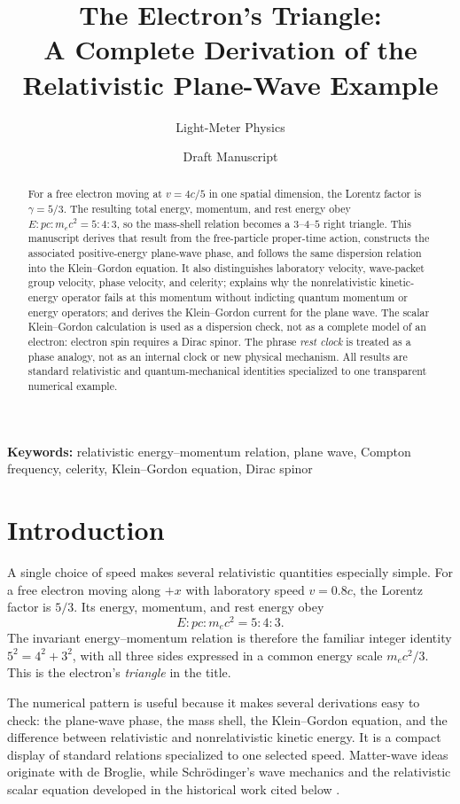 \documentclass[12pt]{article}
\title{The Electron's Triangle:\\
A Complete Derivation of the Relativistic Plane-Wave Example}
\author{Light-Meter Physics}
\date{Draft Manuscript}
\begin{document}
\maketitle

\begin{abstract}
For a free electron moving at $v=4c/5$ in one spatial dimension, the Lorentz factor is $\gamma=5/3$. The resulting total energy, momentum, and rest energy obey $E:pc:m_ec^2=5:4:3$, so the mass-shell relation becomes a $3$--$4$--$5$ right triangle. This manuscript derives that result from the free-particle proper-time action, constructs the associated positive-energy plane-wave phase, and follows the same dispersion relation into the Klein--Gordon equation. It also distinguishes laboratory velocity, wave-packet group velocity, phase velocity, and celerity; explains why the nonrelativistic kinetic-energy operator fails at this momentum without indicting quantum momentum or energy operators; and derives the Klein--Gordon current for the plane wave. The scalar Klein--Gordon calculation is used as a dispersion check, not as a complete model of an electron: electron spin requires a Dirac spinor. The phrase \emph{rest clock} is treated as a phase analogy, not as an internal clock or new physical mechanism. All results are standard relativistic and quantum-mechanical identities specialized to one transparent numerical example.
\end{abstract}

\noindent\textbf{Keywords:} relativistic energy--momentum relation, plane wave, Compton frequency, celerity, Klein--Gordon equation, Dirac spinor

\section{Introduction}

A single choice of speed makes several relativistic quantities especially simple. For a free electron moving along $+x$ with laboratory speed $v=0.8c$, the Lorentz factor is $5/3$. Its energy, momentum, and rest energy obey
\begin{equation}
  E:pc:m_ec^2=5:4:3.
\end{equation}
The invariant energy--momentum relation is therefore the familiar integer identity $5^2=4^2+3^2$, with all three sides expressed in a common energy scale $m_ec^2/3$. This is the electron's \emph{triangle} in the title.

The numerical pattern is useful because it makes several derivations easy to check: the plane-wave phase, the mass shell, the Klein--Gordon equation, and the difference between relativistic and nonrelativistic kinetic energy. It is a compact display of standard relations specialized to one selected speed. Matter-wave ideas originate with de Broglie, while Schr\"odinger's wave mechanics and the relativistic scalar equation developed in the historical work cited below \cite{deBroglie1925,Schrodinger1926,Klein1926,Gordon1926}.
\end{document}
